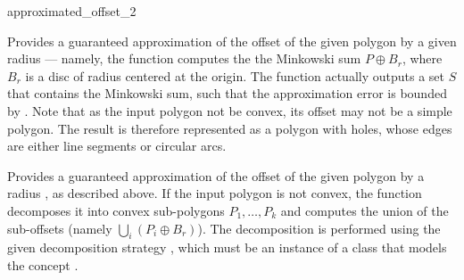 
\ccRefPageBegin

\begin{ccRefFunction}{approximated_offset_2}


   {Provides a guaranteed approximation of the offset of the given polygon
     by a given radius  --- namely, the function computes the
    the Minkowski sum $P \oplus B_r$, where $B_r$ is a disc of radius
     centered at the origin.
    The function actually outputs a set $S$ that contains the Minkowski sum,
    such that the approximation error is bounded by .
    Note that as the input polygon not be convex, its offset may not be a
    simple polygon. The result is therefore represented as a polygon with
    holes, whose edges are either line segments or circular arcs.
    }

   {Provides a guaranteed approximation of the offset of the given polygon
     by a radius , as described above.
    If the input polygon  is not convex, the function
    decomposes it into convex sub-polygons $P_1, \ldots, P_k$ and computes
    the union of the sub-offsets (namely $\bigcup_{i}{(P_i \oplus B_r)}$).
    The decomposition is performed using the given decomposition strategy
    , which must be an instance of a class that models the
    concept .
    }

\end{ccRefFunction}

\ccRefPageEnd
